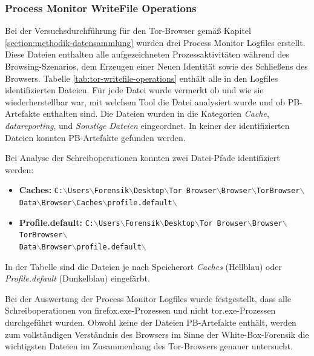 \begin{appendices}
\subsubsection*{Process Monitor WriteFile Operations}
\label{subsubsection:appendix-tor-common-locations-writefile-operations}
Bei der Versuchsdurchführung für den Tor-Browser gemäß Kapitel \ref{section:methodik-datensammlung} wurden drei Process Monitor Logfiles erstellt.
Diese Dateien enthalten alle aufgezeichneten Prozessaktivitäten während des Browsing-Szenarios, dem Erzeugen einer \glqq{}Neuen Identität\grqq{} sowie des Schließens des Browsers.
Tabelle \ref{tab:tor-writefile-operations} enthält alle in den Logfiles identifizierten Dateien.
Für jede Datei wurde vermerkt ob und wie sie wiederherstellbar war, mit welchem Tool die Datei analysiert wurde und ob PB-Artefakte enthalten sind.
Die Dateien wurden in die Kategorien \textit{Cache}, \textit{datareporting}, und \textit{Sonstige Dateien} eingeordnet.
In keiner der identifizierten Dateien konnten PB-Artefakte gefunden werden. 

Bei Analyse der Schreiboperationen konnten zwei Datei-Pfade identifiziert werden:
\begin{itemize}
\item \textbf{Caches:} \texttt{C:$\backslash$Users$\backslash$Forensik$\backslash$Desktop$\backslash$Tor Browser$\backslash$Browser$\backslash$TorBrowser$\backslash$\\Data$\backslash$Browser$\backslash$Caches$\backslash$profile.default$\backslash$}
\item \textbf{Profile.default:} \texttt{C:$\backslash$Users$\backslash$Forensik$\backslash$Desktop$\backslash$Tor Browser$\backslash$Browser$\backslash$TorBrowser$\backslash$\\Data$\backslash$Browser$\backslash$profile.default$\backslash$}
\end{itemize}
In der Tabelle sind die Dateien je nach Speicherort \textit{Caches} (Hellblau) oder \textit{Profile.default} (Dunkelblau) eingefärbt. 

Bei der Auswertung der Process Monitor Logfiles wurde festgestellt, dass alle Schreiboperationen von \glqq{}firefox.exe\grqq{}-Prozessen und nicht \glqq{}tor.exe\grqq{}-Prozessen durchgeführt wurden. Obwohl keine der Dateien PB-Artefakte enthält, werden zum vollständigen Verständnis des Browsers im Sinne der White-Box-Forensik die wichtigsten Dateien im Zusammenhang des Tor-Browsers genauer untersucht.


\end{appendices}
